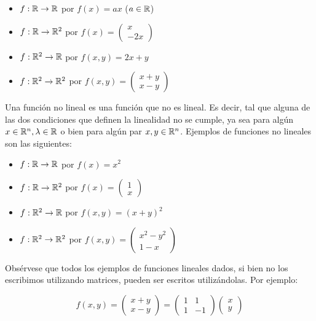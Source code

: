 \begin{itemize}
    \item $f: \mathbb{R} \to \mathbb{R}$ por $f(x) = ax$ ($a \in \mathbb{R}$)
    \item $f: \mathbb{R} \to \mathbb{R}^2$ por $f(x) = \begin{pmatrix}
        x \\ -2x
    \end{pmatrix}$
    \item $f: \mathbb{R}^2 \to \mathbb{R}$ por $f(x, y) = 2x + y$
    \item $f: \mathbb{R}^2 \to \mathbb{R}^2$ por $f(x, y) = \begin{pmatrix}
        x + y \\ x - y
    \end{pmatrix}$
\end{itemize}

Una función no lineal es una función que no es lineal. Es decir, tal que alguna de las dos condiciones que definen la linealidad no se cumple, ya sea para algún $x \in \mathbb{R}^n, \lambda \in \mathbb{R}$ o bien para algún par $x, y \in \mathbb{R}^n$. Ejemplos de funciones no lineales son las siguientes:

\begin{itemize}
    \item $f: \mathbb{R} \to \mathbb{R}$ por $f(x) = x^2$
    \item $f: \mathbb{R} \to \mathbb{R}^2$ por $f(x) = \begin{pmatrix}
        1 \\ x
    \end{pmatrix}$
    \item $f: \mathbb{R}^2 \to \mathbb{R}$ por $f(x, y) = (x + y)^2$
    \item $f: \mathbb{R}^2 \to \mathbb{R}^2$ por $f(x, y) = \begin{pmatrix}
        x^2 - y^2 \\ 1 - x
    \end{pmatrix}$
\end{itemize}

Obsérvese que todos los ejemplos de funciones lineales dados, si bien no los escribimos utilizando matrices, pueden ser escritos utilizándolas. Por ejemplo:

\[f(x, y) = \begin{pmatrix}
    x + y \\ x - y
\end{pmatrix} = \begin{pmatrix}
    1 & 1 \\ 1 & -1
\end{pmatrix} \begin{pmatrix}
    x \\ y
\end{pmatrix}\]

